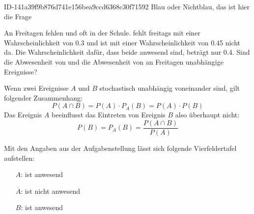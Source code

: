 \begin{exercise}
      {ID-141a39f9b876d741e156bea9ccd6368c30f71592}
      {Blau oder Nichtblau, das ist hier die Frage}
  \ifproblem\problem\par
    An Freitagen fehlen \xya{} und \xxb{} oft
    in der Schule. \xya{} fehlt freitags mit einer
    Wahrscheinlichkeit von \num{0.3} und \xxb{}
    ist mit einer Wahrscheinlichkeit von \num{0.45}
    nicht da. Die Wahrscheinlichkeit dafür,
    dass beide anwesend sind, beträgt nur \num{0.4}.
    Sind die Abwesenheit von \xya{} und die
    Abwesenheit von \xxb{} an Freitagen unabhängige
    Ereignisse?
  \fi
  \ifoutline\outline\par
    Wenn zwei Ereignisse $A$ und $B$ stochastisch
    unabhängig voneinander sind, gilt folgender
    Zusammenhang:
    \begin{equation*}
      P(A\cap B)=P(A)\cdot P_{A}(B)=P(A)\cdot P(B)
    \end{equation*}
    Das Ereignis $A$ beeinflusst das Eintreten
    von Ereignis $B$ also überhaupt nicht:
    \begin{equation*}
      P(B)
      =
      P_{A}(B)
      =
      \frac{P(A\cap B)}{P(A)}
    \end{equation*}
  \fi
  \ifoutcome\outcome\par
    Mit den Angaben aus der Aufgabenstellung lässt
    sich folgende Vierfeldertafel aufstellen:\par
    \begin{minipage}{0.4\linewidth}
      \begin{fofotab}%
      \end{fofotab}%
    \end{minipage}%
    \begin{minipage}{0.58\linewidth}
      \begin{itemize}
        \renewcommand{\itemsep}{-1ex}%
        \item[$A$:] \glqq\xya{} ist anwesend\grqq
        \item[$\overline{A}$:] \glqq\xya{} ist nicht anwesend\grqq
        \item[$B$:] \glqq\xxb{} ist anwesend\grqq

\end{itemize}
\end{minipage}
\end{exercise}
